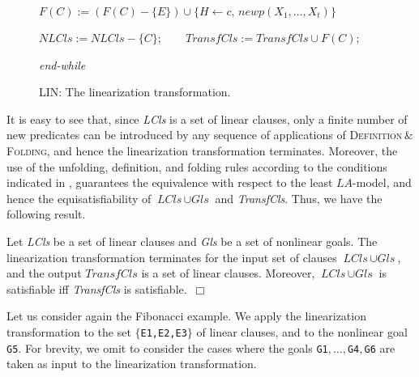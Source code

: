 \documentclass[english]{tlp}
\newcommand{\tts}{\tt \small}
\newcommand{\eop}{\hfill$\Box$}
\begin{document}
\begin{figure}[ht]
\begin{flushleft}
\begin{minipage}{124mm}
\noindent
\hspace*{8mm}$F(C) := (F(C) - \{E\}) \cup \{H \leftarrow c,\, \textit{newp}(X_1,\ldots,X_t)\}$\\[-5mm]

\noindent
\hspace*{3mm}


\smallskip
\noindent $\textit{NLCls}:=\textit{NLCls}-\{C\}$;
~~~ $\textit{TransfCls}:=\textit{TransfCls}\cup \textit{F}(C)$;

\end{minipage} 

\smallskip

\noindent \textit{end-while}

\end{flushleft}

\vspace*{-4mm}
\noindent\hrulefill
\vspace*{-2.mm}
\caption {LIN: The \textrm{linearization} transformation.}
\label{fig:Lin}
\vspace*{-4mm}

\end{figure}


It is easy to see that, since \textit{LCls} is a set of  linear clauses, 
only a finite number of new predicates can be 
 introduced by any sequence of applications of
\textsc{Definition}\,\&\,\textsc{Folding}, and hence 
the {\rm linearization} transformation terminates.
Moreover, the use of the unfolding, definition, and folding rules 
according to the conditions indicated in \cite{EtG96},
guarantees the equivalence with respect to the least ${\textit{LA}}$-model, and hence
the equisatisfiability of $\textit{LCls}\, \cup \textit{Gls}$ and \textit{TransfCls}. 
Thus, we have the following result. 
\vspace{-1mm}


\begin{theorem}\label{thm:term-corr}
Let {\it LCls} be a set of linear clauses and \textit{Gls} be a set of nonlinear goals. The \textrm{linearization} transformation terminates for the input set of clauses $\textit{LCls}\, \cup \textit{Gls}$, and the output $\textit{TransfCls}$ is a set of linear clauses.
Moreover, $\textit{LCls}\, \cup \textit{Gls}$ is satisfiable iff
 \textit{TransfCls} is satisfiable.~\eop
\end{theorem}

\noindent
Let us consider again the Fibonacci example.
We apply the {\rm linearization} transformation to the set $\{${\tts E1,E2,E3}$\}$
of linear clauses, and to the nonlinear goal {\tts G5}. For brevity, we omit to
consider the cases where the goals {\tt G1$,\ldots,$G4$,$G6} are taken as input to the {\rm linearization} transformation.
\end{document}
